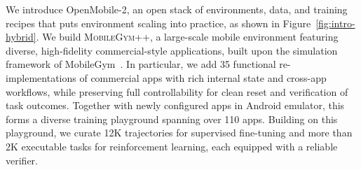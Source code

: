We introduce OpenMobile-2, an open stack of environments, data, and training recipes that puts environment scaling into practice, as shown in Figure~\ref{fig:intro-hybrid}.
We build \textsc{MobileGym++}, a large-scale mobile environment featuring diverse, high-fidelity commercial-style applications, built upon the simulation framework of MobileGym~\citep{wu2026mobilegym}.
In particular, we add 35 functional re-implementations of commercial apps with rich internal state and cross-app workflows, while preserving full controllability for clean reset and verification of task outcomes.
Together with newly configured apps in Android emulator, this forms a diverse training playground spanning over 110 apps. Building on this playground, we curate 12K trajectories for supervised fine-tuning and more than 2K executable tasks for reinforcement learning, each equipped with a reliable verifier.


